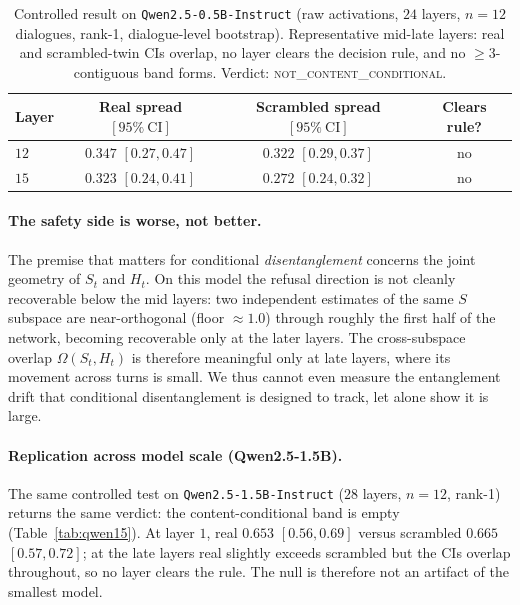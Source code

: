 \begin{table}[t]
\centering
\small
\begin{tabular}{@{}lccc@{}}
\toprule
Layer & Real spread $[95\%\ \text{CI}]$ & Scrambled spread $[95\%\ \text{CI}]$ & Clears rule? \\
\midrule
$12$ & $0.347$ $[0.27,0.47]$ & $0.322$ $[0.29,0.37]$ & no \\
$15$ & $0.323$ $[0.24,0.41]$ & $0.272$ $[0.24,0.32]$ & no \\
\bottomrule
\end{tabular}
\caption{Controlled result on \texttt{Qwen2.5-0.5B-Instruct} (raw activations, $24$ layers,
$n{=}12$ dialogues, rank-1, dialogue-level bootstrap). Representative mid-late layers: real and
scrambled-twin CIs overlap, no layer clears the decision rule, and no $\geq 3$-contiguous band
forms. Verdict: \textsc{not\_content\_conditional}.}
\label{tab:qwen05}
\end{table}

\paragraph{The safety side is worse, not better.} The premise that matters for conditional
\emph{disentanglement} concerns the joint geometry of $S_t$ and $H_t$. On this model the
refusal direction is not cleanly recoverable below the mid layers: two independent estimates of
the same $S$ subspace are near-orthogonal (floor $\approx 1.0$) through roughly the first half
of the network, becoming recoverable only at the later layers. The cross-subspace overlap
$\Omega(S_t,H_t)$ is therefore meaningful only at late layers, where its movement across turns
is small. We thus cannot even measure the entanglement drift that conditional disentanglement
is designed to track, let alone show it is large.

\paragraph{Replication across model scale (Qwen2.5-1.5B).} The same controlled test on
\texttt{Qwen2.5-1.5B-Instruct} ($28$ layers, $n{=}12$, rank-1) returns the same verdict: the
content-conditional band is empty (Table~\ref{tab:qwen15}). At layer $1$, real $0.653$
$[0.56,0.69]$ versus scrambled $0.665$ $[0.57,0.72]$; at the late layers real slightly exceeds
scrambled but the CIs overlap throughout, so no layer clears the rule. The null is therefore
not an artifact of the smallest model.


